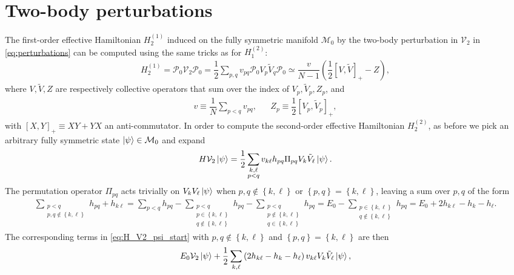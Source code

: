 \documentclass[nofootinbib,notitlepage,11pt]{revtex4-2}
\newcommand{\f}[2]{\dfrac{#1}{#2}} %
\newcommand{\p}[1]{\left(#1\right)} %
\renewcommand{\sp}[1]{\left[#1\right]} %
\renewcommand{\set}[1]{\left\{#1\right\}} %
\newcommand{\1}{\mathds{1}}
\newcommand{\M}{\mathcal{M}}
\renewcommand{\P}{\mathcal{P}}
\newcommand{\V}{\mathcal{V}}
\begin{document}
\section{Two-body perturbations}

The first-order effective Hamiltonian $H_2^{(1)}$ induced on the fully
symmetric manifold $\M_0$ by the two-body perturbation in $\V_2$ in
\eqref{eq:perturbations} can be computed using the same tricks as for
$H_1^{(2)}$:
\begin{align}
  H_2^{(1)}
  = \P_0 \V_2 \P_0
  = \f12 \sum_{p,q} v_{pq} \P_0 V_p \tilde V_q \P_0
  \simeq \f{v}{N-1} \p{\f12 \sp{V,\tilde V}_+ - Z},
\end{align}
where $V,\tilde V,Z$ are respectively collective operators that sum
over the index of $V_p,\tilde V_p,Z_p$, and
\begin{align}
  v \equiv \f1N \sum_{p<q} v_{pq},
  &&
  Z_p \equiv \f12 \sp{V_p, \tilde V_p}_+,
\end{align}
with $\sp{X,Y}_+\equiv XY+YX$ an anti-commutator.  In order to compute
the second-order effective Hamiltonian $H_2^{(2)}$, as before we pick
an arbitrary fully symmetric state $\ket\psi\in\M_0$ and expand
\begin{align}
  H \V_2 \ket\psi
  = \f12 \sum_{\substack{k,\ell\\p<q}} v_{k\ell} h_{pq}
  \Pi_{pq} V_k \tilde V_\ell \ket\psi.
  \label{eq:H_V2_psi_start}
\end{align}
The permutation operator $\Pi_{pq}$ acts trivially on
$V_k V_\ell \ket\psi$ when $p,q\notin\set{k,\ell}$ or
$\set{p,q}=\set{k,\ell}$, leaving a sum over $p,q$ of the form
\begin{align}
  \sum_{\substack{p<q\\p,q\notin\set{k,\ell}}} h_{pq} + h_{k\ell}
  = \sum_{p<q} h_{pq}
  - \sum_{\substack{p<q\\p\in\set{k,\ell}\\q\notin\set{k,\ell}}} h_{pq}
  - \sum_{\substack{p<q\\p\notin\set{k,\ell}\\q\in\set{k,\ell}}} h_{pq}
  = E_0 - \sum_{\substack{p\in\set{k,\ell}\\q\notin\set{k,\ell}}} h_{pq}
  = E_0 + 2 h_{k\ell} - h_k - h_\ell.
\end{align}
The corresponding terms in \eqref{eq:H_V2_psi_start} with
$p,q\notin\set{k,\ell}$ and $\set{p,q}=\set{k,\ell}$ are then
\begin{align}
  E_0 \V_2 \ket\psi + \f12 \sum_{k,\ell}
  \p{2 h_{k\ell} - h_k - h_\ell}
  v_{k\ell} V_k \tilde V_\ell \ket\psi,
\end{align}
\end{document}

